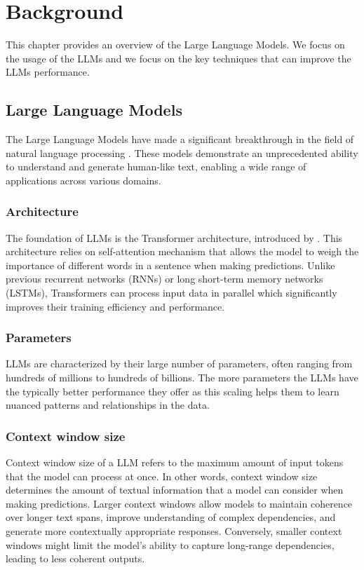 \chapter{Background}

This chapter provides an overview of the Large Language Models. We focus on the usage of the LLMs and we focus on the key techniques that can improve the LLMs performance.


\section{Large Language Models}

The Large Language Models have made a significant breakthrough in the field of natural language processing \cite{Peters2018,Devlin2019,Brown2020}. These models demonstrate an unprecedented ability to understand and generate human-like text, enabling a wide range of applications across various domains.


\subsection{Architecture}

The foundation of LLMs is the Transformer architecture, introduced by \citet{Vaswani2017}. This architecture relies on self-attention mechanism that allows the model to weigh the importance of different words in a sentence when making predictions. Unlike previous recurrent networks (RNNs) or long short-term memory networks (LSTMs), Transformers can process input data in parallel which significantly improves their training efficiency and performance.


\subsection{Parameters}

LLMs are characterized by their large number of parameters, often ranging from hundreds of millions to hundreds of billions. The more parameters the LLMs have the typically better performance they offer \cite{Kaplan2020} as this scaling helps them to learn nuanced patterns and relationships in the data.


\subsection{Context window size}

Context window size of a LLM refers to the maximum amount of input tokens that the model can process at once. In other words, context window size determines the amount of textual information that a model can consider when making predictions. Larger context windows allow models to maintain coherence over longer text spans, improve understanding of complex dependencies, and generate more contextually appropriate responses. Conversely, smaller context windows might limit the model's ability to capture long-range dependencies, leading to less coherent outputs.


